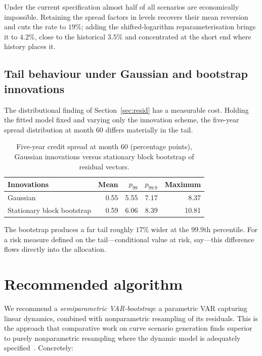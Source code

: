 \documentclass[11pt,a4paper]{article}
\begin{document}
Under the current specification almost half of all scenarios are economically
impossible. Retaining the spread factors in levels recovers their mean reversion
and cuts the rate to $19\%$; adding the shifted-logarithm reparameterisation
brings it to $4.2\%$, close to the historical $3.5\%$ and concentrated at the
short end where history places it.

\subsection{Tail behaviour under Gaussian and bootstrap innovations}

The distributional finding of Section~\ref{sec:resid} has a measurable cost.
Holding the fitted model fixed and varying only the innovation scheme, the
five-year spread distribution at month 60 differs materially in the tail.

\begin{table}[htbp]
\centering
\caption{Five-year credit spread at month 60 (percentage points), Gaussian
innovations versus stationary block bootstrap of residual vectors.}
\label{tab:tails}
\begin{tabular}{lrrrr}
\toprule
Innovations & Mean & $p_{99}$ & $p_{99.9}$ & Maximum \\
\midrule
Gaussian                    & 0.55 & 5.55 & 7.17 & 8.37 \\
Stationary block bootstrap  & 0.59 & 6.06 & 8.39 & 10.81 \\
\bottomrule
\end{tabular}
\end{table}

The bootstrap produces a far tail roughly $17\%$ wider at the $99.9$th
percentile. For a risk measure defined on the tail---conditional value at risk,
say---this difference flows directly into the allocation.

\section{Recommended algorithm}
\label{sec:algo}

We recommend a \emph{semiparametric VAR-bootstrap}: a parametric VAR capturing
linear dynamics, combined with nonparametric resampling of its residuals. This
is the approach that comparative work on curve scenario generation finds
superior to purely nonparametric resampling where the dynamic model is
adequately specified~\cite{scenariocomp}. Concretely:
\end{document}
